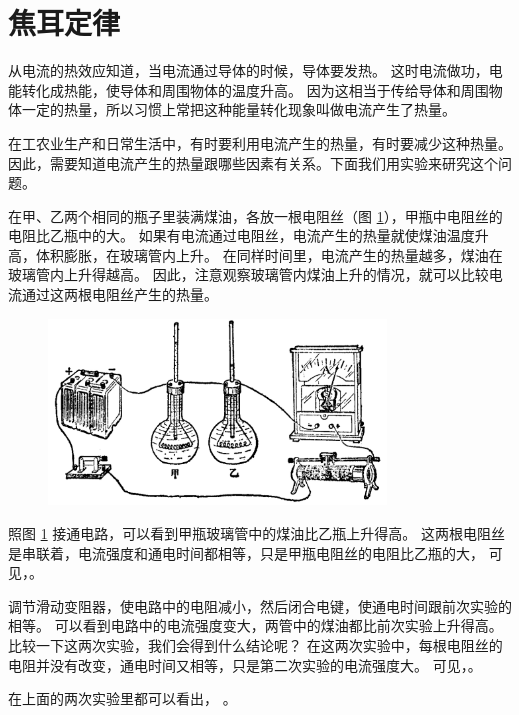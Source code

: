 \section{焦耳定律}\label{sec:9-4}

从电流的热效应知道，当电流通过导体的时候，导体要发热。
这时电流做功，电能转化成热能，使导体和周围物体的温度升高。
因为这相当于传给导体和周围物体一定的热量，所以习惯上常把这种能量转化现象叫做电流产生了热量。

在工农业生产和日常生活中，有时要利用电流产生的热量，有时要减少这种热量。
因此，需要知道电流产生的热量跟哪些因素有关系。下面我们用实验来研究这个问题。

在甲、乙两个相同的瓶子里装满煤油，各放一根电阻丝（图 \ref{fig:9-5}），甲瓶中电阻丝的电阻比乙瓶中的大。
如果有电流通过电阻丝，电流产生的热量就使煤油温度升高，体积膨胀，在玻璃管内上升。
在同样时间里，电流产生的热量越多，煤油在玻璃管内上升得越高。
因此，注意观察玻璃管内煤油上升的情况，就可以比较电流通过这两根电阻丝产生的热量。

\begin{figure}[htbp]
    \centering
    \includegraphics[width=0.8\textwidth]{../pic/czwl2-ch9-5}
    \caption{}\label{fig:9-5}
\end{figure}

照图 \ref{fig:9-5} 接通电路，可以看到甲瓶玻璃管中的煤油比乙瓶上升得高。
这两根电阻丝是串联着，电流强度和通电时间都相等，只是甲瓶电阻丝的电阻比乙瓶的大，
可见，。

调节滑动变阻器，使电路中的电阻减小，然后闭合电键，使通电时间跟前次实验的相等。
可以看到电路中的电流强度变大，两管中的煤油都比前次实验上升得高。
比较一下这两次实验，我们会得到什么结论呢？
在这两次实验中，每根电阻丝的电阻并没有改变，通电时间又相等，只是第二次实验的电流强度大。
可见，。

在上面的两次实验里都可以看出，
。

